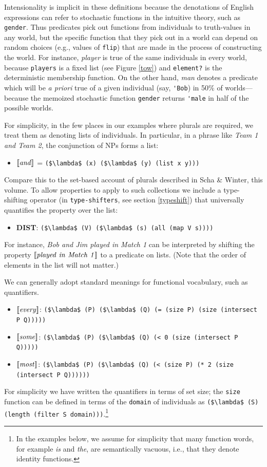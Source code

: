 \documentclass[pdfextras]{handbook}
\newcommand{\llbracket}{\ensuremath{\left [\!\left [}}%
\newcommand{\rrbracket}{\ensuremath{\right ]\!\right ]}}
\providecommand{\sv}[1]{\ensuremath{\llbracket \mathit{#1} \rrbracket}}
\begin{document}
Intensionality is implicit in these definitions because the denotations of English expressions can refer to stochastic functions in the intuitive theory, such as \lstinline{gender}.
Thus predicates pick out functions from individuals to truth-values in any world, but the specific function that they pick out in a world can depend on random choices (e.g., values of \lstinline{flip}) that are made in the process of constructing the world. 
For instance, \emph{player} is true of the same individuals in every world, because \lstinline{players} is a fixed list (see Figure \ref{tow}) and \lstinline{element?} is the deterministic membership function. 
On the other hand, \emph{man} denotes a predicate which will be \emph{a priori} true of a given individual (say, \lstinline{'Bob}) in 50\% of worlds---because the memoized stochastic function \lstinline{gender} returns \lstinline{'male} in half of the possible worlds.

For simplicity, in the few places in our examples where plurals are required, we treat them as denoting lists of individuals. In particular, in a phrase like \emph{Team 1 and Team 2}, the conjunction of NPs forms a list: 
\begin{itemize}
\item \sv{and} = \lstinline[mathescape]{($\lambda$ (x) ($\lambda$ (y) (list x y)))}
\end{itemize}
Compare this to the set-based account of plurals described in Scha \& Winter, this volume. To allow properties to apply to such collections we include a type-shifting operator (in \lstinline{type-shifters}, see section \ref{typeshift}) that universally quantifies the property over the list:
\begin{itemize}
\item \textbf{DIST}: \lstinline[mathescape]{($\lambda$ (V) ($\lambda$ (s) (all (map V s))))}
\end{itemize}
For instance, \emph{Bob and Jim played in Match 1} can be interpreted by shifting the property \sv{played\ in\ Match\ 1} to a predicate on lists. (Note that the order of elements in the list will not matter.)

We can generally adopt standard meanings for functional vocabulary, such as quantifiers. 
\begin{itemize}
\item \sv{every}: \lstinline[mathescape]{($\lambda$ (P) ($\lambda$ (Q) (= (size P) (size (intersect P Q)))))}
\item \sv{some}: \lstinline[mathescape]{($\lambda$ (P) ($\lambda$ (Q) (< 0 (size (intersect P Q)))))}
\item \sv{most}: \lstinline[mathescape]{($\lambda$ (P) ($\lambda$ (Q) (< (size P) (* 2 (size (intersect P Q))))))}
\end{itemize}
For simplicity we have written the quantifiers in terms of set size; the \lstinline{size} function can be defined in terms of the \lstinline{domain} of individuals as \lstinline[mathescape]{($\lambda$ (S) (length (filter S domain)))}.\footnote{In the examples below, we assume for simplicity that many function words, for example \emph{is} and \emph{the}, are semantically vacuous, i.e., that they denote identity functions.}
\end{document}
